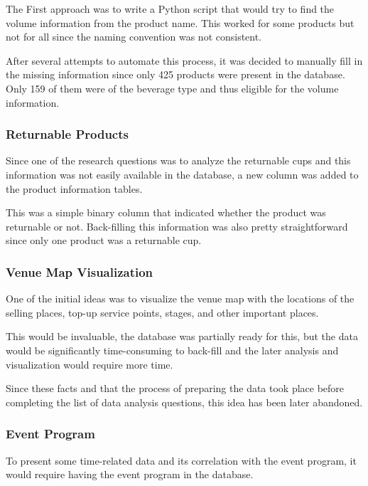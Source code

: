 The First approach was to write a Python script that would try to find the volume information from the product name.
This worked for some products but not for all since the naming convention was not consistent.

After several attempts to automate this process, it was decided to manually fill in the missing information since only 425 products were present in the database.
Only 159 of them were of the beverage type and thus eligible for the volume information.

\subsubsection{Returnable Products}
\label{subsubsec:data-methodology-local-database-modifications-returnable}
Since one of the research questions was to analyze the returnable cups and this information was not easily available in the database, a new column was added to the product information tables.

This was a simple binary column that indicated whether the product was returnable or not.
Back-filling this information was also pretty straightforward since only one product was a returnable cup.

\subsubsection{Venue Map Visualization}
\label{subsubsec:data-methodology-local-database-modifications-venue-map}
One of the initial ideas was to visualize the venue map with the locations of the selling places, top-up service points, stages, and other important places.

This would be invaluable, the database was partially ready for this, but the data would be significantly time-consuming to back-fill and the later analysis and visualization would require more time.

Since these facts and that the process of preparing the data took place before completing the list of data analysis questions, this idea has been later abandoned.

\subsubsection{Event Program}
\label{subsubsec:data-methodology-local-database-modifications-program}
To present some time-related data and its correlation with the event program, it would require having the event program in the database.

